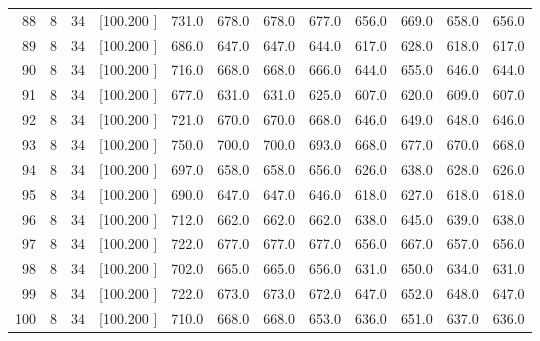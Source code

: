 \documentclass[12pt,a4paper]{article}
\begin{document}
\begin{center}
{\begin{tabular}{r r r r r r r r r r r r}
  88&  8& 34&[100.200   ]&   731.0&   678.0&   678.0&   677.0&   656.0&   669.0&   658.0&   656.0\\[-0.02in]
  89&  8& 34&[100.200   ]&   686.0&   647.0&   647.0&   644.0&   617.0&   628.0&   618.0&   617.0\\[-0.02in]
  90&  8& 34&[100.200   ]&   716.0&   668.0&   668.0&   666.0&   644.0&   655.0&   646.0&   644.0\\[-0.02in]
  91&  8& 34&[100.200   ]&   677.0&   631.0&   631.0&   625.0&   607.0&   620.0&   609.0&   607.0\\[-0.02in]
  92&  8& 34&[100.200   ]&   721.0&   670.0&   670.0&   668.0&   646.0&   649.0&   648.0&   646.0\\[-0.02in]
  93&  8& 34&[100.200   ]&   750.0&   700.0&   700.0&   693.0&   668.0&   677.0&   670.0&   668.0\\[-0.02in]
  94&  8& 34&[100.200   ]&   697.0&   658.0&   658.0&   656.0&   626.0&   638.0&   628.0&   626.0\\[-0.02in]
  95&  8& 34&[100.200   ]&   690.0&   647.0&   647.0&   646.0&   618.0&   627.0&   618.0&   618.0\\[-0.02in]
  96&  8& 34&[100.200   ]&   712.0&   662.0&   662.0&   662.0&   638.0&   645.0&   639.0&   638.0\\[-0.02in]
  97&  8& 34&[100.200   ]&   722.0&   677.0&   677.0&   677.0&   656.0&   667.0&   657.0&   656.0\\[-0.02in]
  98&  8& 34&[100.200   ]&   702.0&   665.0&   665.0&   656.0&   631.0&   650.0&   634.0&   631.0\\[-0.02in]
  99&  8& 34&[100.200   ]&   722.0&   673.0&   673.0&   672.0&   647.0&   652.0&   648.0&   647.0\\[-0.02in]
 100&  8& 34&[100.200   ]&   710.0&   668.0&   668.0&   653.0&   636.0&   651.0&   637.0&   636.0\\[-0.02in]

\hline
\end{tabular}}
\end{center}
\end{document}
